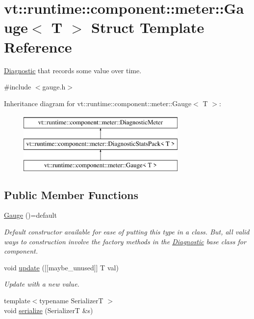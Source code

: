 \hypertarget{structvt_1_1runtime_1_1component_1_1meter_1_1_gauge}{}\section{vt\+:\+:runtime\+:\+:component\+:\+:meter\+:\+:Gauge$<$ T $>$ Struct Template Reference}
\label{structvt_1_1runtime_1_1component_1_1meter_1_1_gauge}


\hyperlink{structvt_1_1runtime_1_1component_1_1_diagnostic}{Diagnostic} that records some value over time.  




{\ttfamily \#include $<$gauge.\+h$>$}

Inheritance diagram for vt\+:\+:runtime\+:\+:component\+:\+:meter\+:\+:Gauge$<$ T $>$\+:\begin{figure}[H]
\begin{center}
\leavevmode
\includegraphics[height=3.000000cm]{structvt_1_1runtime_1_1component_1_1meter_1_1_gauge}
\end{center}
\end{figure}
\subsection*{Public Member Functions}
\begin{DoxyCompactItemize}
\item 
\hyperlink{structvt_1_1runtime_1_1component_1_1meter_1_1_gauge_a39b552111951ca991e92b7a3886e7d97}{Gauge} ()=default
\begin{DoxyCompactList}\small\item\em Default constructor available for ease of putting this type in a class. But, all valid ways to construction involve the factory methods in the {\ttfamily \hyperlink{structvt_1_1runtime_1_1component_1_1_diagnostic}{Diagnostic}} base class for component. \end{DoxyCompactList}\item 
void \hyperlink{structvt_1_1runtime_1_1component_1_1meter_1_1_gauge_a732cd2244376880d76296696a6f8a871}{update} (\mbox{[}\mbox{[}maybe\+\_\+unused\mbox{]}\mbox{]} T val)
\begin{DoxyCompactList}\small\item\em Update with a new value. \end{DoxyCompactList}\item 
{\footnotesize template$<$typename SerializerT $>$ }\\void \hyperlink{structvt_1_1runtime_1_1component_1_1meter_1_1_gauge_a5b4a65a1c46ee3d97e927dc6653d8d29}{serialize} (SerializerT \&s)
\end{DoxyCompactItemize}
